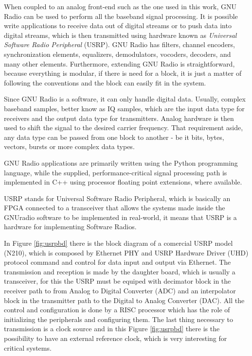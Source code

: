 When coupled to an analog front-end such as the one used in this work, GNU Radio
can be used to perform all the baseband signal processing. It is possible write
applications to receive data out of digital streams or to push data into digital
streams, which is then transmitted using hardware known as \textit{Universal
Software Radio Peripheral} (USRP). GNU Radio has filters, channel encoders,
synchronization elements, equalizers, demodulators, vocoders, decoders, and many
other elements. Furthermore, extending GNU Radio is straightforward, because
everything is modular, if there is need for a block, it is just a matter of
following the conventions and the block can easily fit in the system.

Since GNU Radio is a software, it can only handle digital data. Usually, complex
baseband samples, better know as IQ samples, which are the input data type for
receivers and the output data type for transmitters. Analog hardware is then
used to shift the signal to the desired carrier frequency. That requirement
aside, any data type can be passed from one block to another - be it bits,
bytes, vectors, bursts or more complex data types.

GNU Radio applications are primarily written using the Python programming
language, while the supplied, performance-critical signal processing path is
implemented in C++ using processor floating point extensions, where available.

USRP stands for Universal Software Radio Peripheral, which is basically an FPGA
connected to a transceiver that allows the systems made inside the GNUradio
software to be implemented in real-world, it means that USRP is a hardware for
implementing Software Radios.

In Figure \ref{fig:usrpbd} there is the block diagram of a comercial USRP
model (N210), which is composed by Ethernet PHY and USRP Hardware Driver (UHD)
protocol command and control for data input and output via Ethernet. The
transmission and reception is made by the daughter board, which is usually a
transceiver, for this the USRP must be equiped with decimator block in the receiver path to
from Analog to Digital Converter (ADC) and an interpolator block in the transmitter path to the
Digital to Analog Converter (DAC). All the control and configuration is done by
a RISC processor which has the role of initializing the peripherals and configuring
them. The last thing necessary to transmission is a clock source and in this
Figure \ref{fig:usrpbd} there is the possibility to have an external reference
clock, which is very interesting for critical systems.

